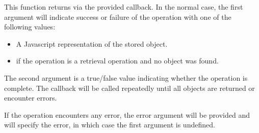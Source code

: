 This function returns via the provided callback.  In the normal case, the first
argument will indicate success or failure of the operation with one of the
following values:

\begin{itemize}[noitemsep]
\item A Javascript representation of the stored object.
\item {} if the operation is a retrieval operation and no object was
    found.
\end{itemize}

The second argument is a true/false value indicating whether the operation is
complete.  The callback will be called repeatedly until all objects are
returned or encounter errors.

If the operation encounters any error, the error argument will be provided and
will specify the error, in which case the first argument is undefined.
